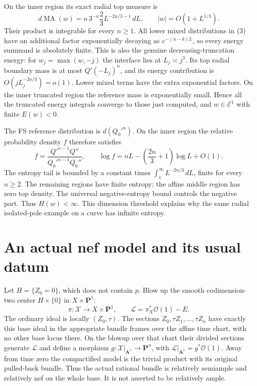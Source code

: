 \documentclass[10pt]{article}
\newcommand{\MA}{\operatorname{MA}}
\newcommand{\PP}{\mathbf P}
\begin{document}
On the inner region its exact radial top measure is
\[
 d\MA(w)=n\,3^{-n}\frac23 L^{-2n/3-1}\,dL,
 \qquad |w|=O(1+L^{1/3}).                              \tag{4}
\]
Their product is integrable for every $n\geq1$. All lower mixed
distributions in (3) have an additional factor exponentially decaying
as $e^{-(n-k)L}$, so every energy summand is absolutely finite.
This is also the genuine decreasing-truncation energy: for
$w_j=\max(w,-j)$ the interface lies at $L_j\asymp j^3$.
Its top radial boundary mass is at most $Q'(-L_j)^n$, and its
energy contribution is $O(jL_j^{-2n/3})=o(1)$.
Lower mixed terms have the extra exponential factors. On the inner
truncated region the reference mass is exponentially small. Hence
all the truncated energy integrals converge to those just computed,
and $w\in\mathcal E^1$ with finite $E(w)<0$.

The FS reference distribution is $d(Q_0'^n)$. On the inner region
the relative probability density $f$ therefore satisfies
\[
 f=\frac{Q'^{n-1}Q''}{Q_0'^{n-1}Q_0''},\qquad
 \log f=nL-\left(\frac{2n}{3}+1\right)\log L+O(1).
                                                               \tag{5}
\]
The entropy tail is bounded by a constant times
$\int_1^\infty L^{-2n/3}\,dL$, finite for every $n\geq2$.
The remaining regions have finite entropy; the affine middle region
has zero top density. The universal negative-entropy bound controls
the negative part. Thus $H(w)<\infty$. This dimension threshold
explains why the same radial isolated-pole example on a curve has
infinite entropy.

\section{An actual nef model and its usual datum}
Let $H=\{Z_0=0\}$, which does not contain $p$. Blow up the smooth
codimension-two center $H\times\{0\}$ in $X\times\PP^1$:
\[
 \pi:\mathcal X\longrightarrow X\times\PP^1,
 \qquad \mathcal L=\pi_X^*\mathcal O(1)-E.
\]
The ordinary ideal is locally $(Z_0,\tau)$. The sections
$Z_0,\tau Z_1,\ldots,\tau Z_n$ have exactly this base ideal in the
appropriate bundle frames over the affine time chart, with no other
base locus there. On the blowup over that chart their divided sections
generate $\mathcal L$ and define a morphism
$g:\mathcal X|_{\mathbf A^1}\to\PP^n$, with
$\mathcal L|_{\mathbf A^1}=g^*\mathcal O(1)$.
Away from time zero the compactified model is the trivial product
with its original pulled-back bundle. Thus the actual rational bundle
is relatively semiample and relatively nef on the whole base.
It is not asserted to be relatively ample.
\end{document}
